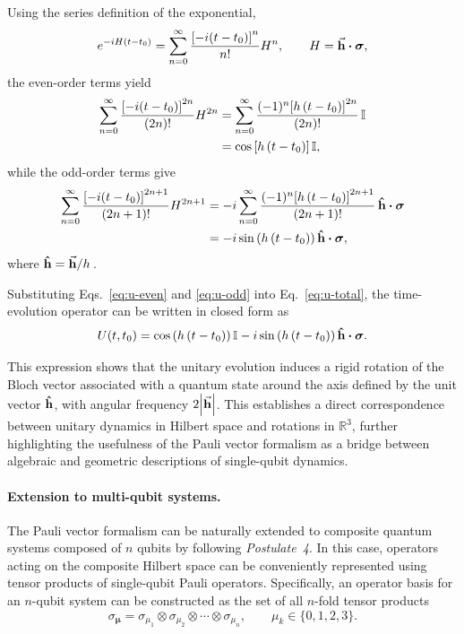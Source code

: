 Using the series definition of the exponential,
\begin{equation}
    \label{eq:u-total}
    e^{-iH(t-t_0)} =
    \sum_{n=0}^{\infty}
    \frac{\qty[-i(t-t_0)]^n}{n!} H^n,
    \qquad
    H = \va{h} \vdot \vb*{\sigma},
\end{equation}
the even-order terms yield
\begin{align}
    \label{eq:u-even}
    \sum_{n=0}^{\infty}
    \frac{\qty[-i(t-t_0)]^{2n}}{(2n)!} H^{2n}
     & =
    \sum_{n=0}^{\infty}
    \frac{(-1)^n \qty[h\, (t-t_0)]^{2n}}{(2n)!}\,\mathbb{I} \nonumber \\
     & =
    \cos\qty[h\, (t-t_0)]\,\mathbb{I},
\end{align}
while the odd-order terms give
\begin{align}
    \label{eq:u-odd}
    \sum_{n=0}^{\infty}
    \frac{\qty[-i(t-t_0)]^{2n+1}}{(2n+1)!} H^{2n+1}
     & =
    -i
    \sum_{n=0}^{\infty}
    \frac{(-1)^n \qty[h\, (t-t_0)]^{2n+1}}{(2n+1)!}
    \, \vu{h} \vdot \vb*{\sigma} \nonumber \\
     & =
    -i \sin\qty(h\, (t-t_0))\,
    \vu{h} \vdot \vb*{\sigma},
\end{align}
where $\vu{h} = \va{h}/h\, $.

Substituting Eqs.~\eqref{eq:u-even} and \eqref{eq:u-odd} into Eq.~\eqref{eq:u-total}, the time-evolution operator can be written in closed form as
\begin{equation}
    U(t,t_0) = \cos\qty(h\, (t-t_0)) \, \id - i \sin\qty(h\, (t-t_0))\, \vu{h} \vdot \vb*{\sigma}.
\end{equation}

This expression shows that the unitary evolution induces a rigid rotation of the Bloch vector associated with a quantum state around the axis defined by the unit vector $\vu{h}$, with angular frequency $2\qty|\va{h}|$. This establishes a direct correspondence between unitary dynamics in Hilbert space and rotations in $\mathbb{R}^3$, further highlighting the usefulness of the Pauli vector formalism as a bridge between algebraic and geometric descriptions of single-qubit dynamics.

\paragraph{Extension to multi-qubit systems.}

The Pauli vector formalism can be naturally extended to composite quantum systems composed of $n$ qubits by following \textit{Postulate~4}. In this case, operators acting on the composite Hilbert space can be conveniently represented using tensor products of single-qubit Pauli operators. Specifically, an operator basis for an $n$-qubit system can be constructed as the set of all $n$-fold tensor products
\begin{equation}
    \sigma_{\boldsymbol{\mu}} = \sigma_{\mu_1} \otimes \sigma_{\mu_2} \otimes \cdots \otimes \sigma_{\mu_n},
    \qquad \mu_k \in \{0,1,2,3\}.
\end{equation}

